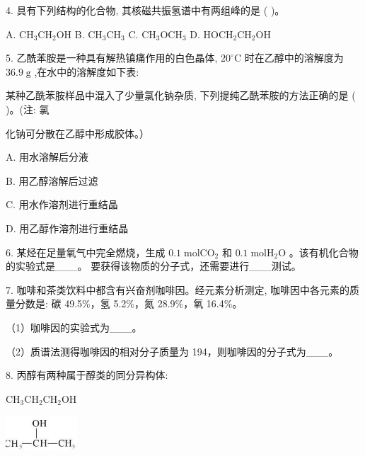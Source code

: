 \documentclass[10pt]{article}
\begin{document}
4. 具有下列结构的化合物, 其核磁共振氢谱中有两组峰的是 ( )。

A. \({\mathrm{{CH}}}_{3}{\mathrm{{CH}}}_{2}\mathrm{{OH}}\) B. \({\mathrm{{CH}}}_{3}{\mathrm{{CH}}}_{3}\) C. \({\mathrm{{CH}}}_{3}{\mathrm{{OCH}}}_{3}\) D. \({\mathrm{{HOCH}}}_{2}{\mathrm{{CH}}}_{2}\mathrm{{OH}}\)

5. 乙酰苯胺是一种具有解热镇痛作用的白色晶体, \({20}^{ \circ }\mathrm{C}\) 时在乙醇中的溶解度为 \({36.9}\mathrm{\;g}\) ,在水中的溶解度如下表:

\begin{center}
\end{center}

某种乙酰苯胺样品中混入了少量氯化钠杂质, 下列提纯乙酰苯胺的方法正确的是 ( )。(注: 氯

化钠可分散在乙醇中形成胶体。）

A. 用水溶解后分液

B. 用乙醇溶解后过滤

C. 用水作溶剂进行重结晶

D. 用乙醇作溶剂进行重结晶

6. 某烃在足量氧气中完全燃烧，生成 \({0.1}\mathrm{\;{mol}}{\mathrm{{CO}}}_{2}\) 和 \({0.1}\mathrm{\;{mol}}{\mathrm{H}}_{2}\mathrm{O}\) 。该有机化合物的实验式是\_\_\_。 要获得该物质的分子式，还需要进行\_\_\_测试。

7. 咖啡和茶类饮料中都含有兴奋剂咖啡因。经元素分析测定, 咖啡因中各元素的质量分数是: 碳 49.5\%，氢 5.2\%，氮 28.9\%，氧 16.4\%。

（1）咖啡因的实验式为\_\_\_。

（2）质谱法测得咖啡因的相对分子质量为 194，则咖啡因的分子式为\_\_\_。

8. 丙醇有两种属于醇类的同分异构体:

\({\mathrm{{CH}}}_{3}{\mathrm{{CH}}}_{2}{\mathrm{{CH}}}_{2}\mathrm{{OH}}\)

\begin{center}
\includegraphics[max width=0.2\textwidth]{images/0190efc5-b58a-7c43-bfb0-e0a030df9cfd_27_657684.jpg}
\end{center}
\end{document}
